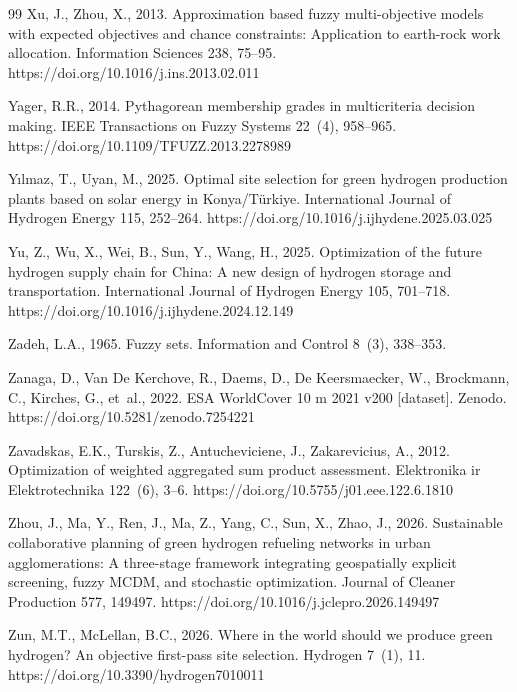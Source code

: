 \documentclass[preprint,12pt,authoryear]{elsarticle}
\begin{document}
\begin{thebibliography}{99}
Xu, J., Zhou, X., 2013. Approximation based fuzzy multi-objective models with expected objectives and chance constraints: Application to earth-rock work allocation. Information Sciences 238, 75--95. https://doi.org/10.1016/j.ins.2013.02.011

Yager, R.R., 2014. Pythagorean membership grades in multicriteria decision making. IEEE Transactions on Fuzzy Systems 22~(4), 958--965. https://doi.org/10.1109/TFUZZ.2013.2278989

Y{\i}lmaz, T., Uyan, M., 2025. Optimal site selection for green hydrogen production plants based on solar energy in Konya/T{\"u}rkiye. International Journal of Hydrogen Energy 115, 252--264. https://doi.org/10.1016/j.ijhydene.2025.03.025

Yu, Z., Wu, X., Wei, B., Sun, Y., Wang, H., 2025. Optimization of the future hydrogen supply chain for China: A new design of hydrogen storage and transportation. International Journal of Hydrogen Energy 105, 701--718. https://doi.org/10.1016/j.ijhydene.2024.12.149

Zadeh, L.A., 1965. Fuzzy sets. Information and Control 8~(3), 338--353.

Zanaga, D., Van De Kerchove, R., Daems, D., De Keersmaecker, W., Brockmann, C., Kirches, G., et~al., 2022. ESA WorldCover 10 m 2021 v200 [dataset]. Zenodo. https://doi.org/10.5281/zenodo.7254221

Zavadskas, E.K., Turskis, Z., Antucheviciene, J., Zakarevicius, A., 2012. Optimization of weighted aggregated sum product assessment. Elektronika ir Elektrotechnika 122~(6), 3--6. https://doi.org/10.5755/j01.eee.122.6.1810

Zhou, J., Ma, Y., Ren, J., Ma, Z., Yang, C., Sun, X., Zhao, J., 2026. Sustainable collaborative planning of green hydrogen refueling networks in urban agglomerations: A three-stage framework integrating geospatially explicit screening, fuzzy MCDM, and stochastic optimization. Journal of Cleaner Production 577, 149497. https://doi.org/10.1016/j.jclepro.2026.149497

Zun, M.T., McLellan, B.C., 2026. Where in the world should we produce green hydrogen? An objective first-pass site selection. Hydrogen 7~(1), 11. https://doi.org/10.3390/hydrogen7010011

\end{thebibliography}
\end{document}
